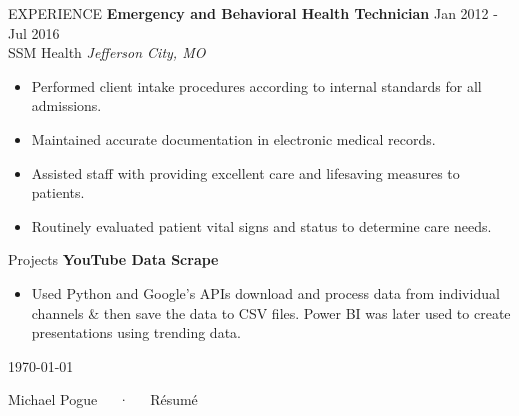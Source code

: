 \documentclass[a4paper,11pt]{article}
\newcommand\textline[4][t]{%
  \vfill\color{lightgray}\par\smallskip\noindent\parbox[#1]{.333\textwidth}{\raggedright\text{}#2}%
  \parbox[#1]{.333\textwidth}{\centering#3}%
  \parbox[#1]{.333\textwidth}{\raggedleft\text{#4}}\par\smallskip%
}
\begin{document}
\begin{Section}{EXPERIENCE}
    \textbf{Emergency and Behavioral Health Technician} \hfill Jan 2012 - Jul 2016\\
    SSM Health \hfill \textit{Jefferson City, MO}
        \begin{itemize}
            \itemsep -3pt {} 
                \item {Performed client intake procedures according to internal standards for all admissions.}
                \item {Maintained accurate documentation in electronic medical records.}
                \item {Assisted staff with providing excellent care and lifesaving measures to patients.}
                \item {Routinely evaluated patient vital signs and status to determine care needs.}
         \end{itemize}
\end{Section} 

\begin{Section}{Projects}
    \textbf{YouTube Data Scrape}
        \begin{itemize}
            \itemsep -3pt {} 
                \item {Used Python and Google's APIs download and process data from individual channels \& then save the data to CSV files. Power BI was later used to create presentations using trending data.}
        \end{itemize}
\end{Section}

\textline[t]{\today}{Michael Pogue~~~·~~~Résumé}{1}
\end{document}
